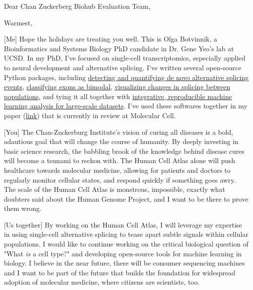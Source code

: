 \date{\today}
\opening{Dear Chan Zuckerberg Biohub Evaluation Team,}
\closing{Warmest,}
\makelettertitle


[Me] Hope the holidays are treating you well. This is Olga Botvinnik, a  Bioinformatics and Systems Biology PhD candidate in Dr. Gene Yeo’s lab at UCSD. In my PhD, I’ve focused on single-cell transcriptomics, especially applied to neural development and alternative splicing. I’ve written several open-source Python packages, including \href{https://github.com/YeoLab/outrigger}{detecting and quantifying de novo alternative splicing events}, \href{https://github.com/YeoLab/anchor}{classifying exons as bimodal}, \href{https://github.com/YeoLab/bonvoyage}{visualizing changes in splicing between populations}, and tying it all together with \href{https://github.com/YeoLab/flotilla/}{integrative, reproducible machine learning analysis for large-scale datasets}. I’ve used these softwares together in my paper (\href{https://drive.google.com/file/d/0B44mjlWGbPILeUJVdWMtb0xDWDg/view?usp=sharing}{link}) that is currently in review at Molecular Cell.

[You] The Chan-Zuckerburg Institute's vision of curing all diseases is a bold, adautious goal that will change
the course of humanity. By deeply investing in basic science research, the babbling brook of the
knowledge behind disease cures will become a tsunami to reckon with. The Human Cell Atlas alone
will push healthcare towards molecular medicine, allowing for patients and doctors to regularly
monitor cellular states, and respond quickly if something goes awry. The scale of the Human Cell
Atlas is monstrous, impossible, exactly what doubters said about the Human Genome Project, and I
want to be there to prove them wrong.

[Us together] By working on the Human Cell Atlas, I will leverage my expertise in using single-cell alternative
splicing to tease apart subtle signals within cellular populations. I would like to continue working on
the critical biological question of "What \emph{is} a cell type?" and developing open-source tools for machine
learning in biology. I believe in the near future, there will be consumer sequencing machines and I
want to be part of the future that builds the foundation for widespread adoption of molecular
medicine, where citizens are scientists, too.

